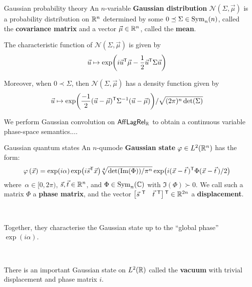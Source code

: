 \documentclass{beamer}
\begin{document}
\begin{frame}{Gaussian probability theory}
An \(n\)-variable \textbf{Gaussian distribution}  \(\mathcal{N}(\Sigma,\vec \mu)\)  is a probability distribution on \(\mathbb{R}^n\) determined by some \(0\preceq \Sigma\in\Sym[n][n]\), called the \textbf{covariance matrix} and a vector \(\vec \mu \in \mathbb{R}^n\), called the \textbf{mean}.

 The characteristic function of  \(\mathcal{N}(\Sigma,\vec \mu)\) is given by
  \[
    \vec u \mapsto \exp(i{\vec u}^{\mathsf{T}}\vec \mu-\frac{1}{2}{\vec u}^{\mathsf{T}} \Sigma \vec u)
  \]
    
   Moreover, when \(0\prec \Sigma\), then  \(\mathcal{N}(\Sigma,\vec \mu)\) has a density function given by 
  \[
    \vec u \mapsto {\exp(\frac{-1}{2}(\vec u-\vec \mu)^ \mathsf{T} \Sigma^{-1} (\vec u-\vec \mu))}/{\sqrt{(2\pi)^n \det (\Sigma)}}
  \]


We perform Gaussian convolution on \(\ALR[\R]\) to obtain a continuous variable phase-space semantics....
\end{frame}


\begin{frame}{Gaussian quantum states}
	An \(n\)-qumode \textbf{Gaussian state} 
	\(\varphi\in L^2 (\mathbb{R}^n)\) has the form:
	\[
    \varphi\left(\vec x\right)=\exp(i\alpha)
	  \exp(i\vec{s}^{\mathsf{T}} \vec x) \sqrt[4]{{\det(\Im(\Phi))}/{\pi^n }}\exp({i}(\vec x -
	  \vec t\,)^{\mathsf{T}} \Phi(\vec x-\vec t\,)/2)
	\]
  where\ \(\alpha \in [0,2\pi)\), \(\vec s,\vec t \in \mathbb{R}^n\), and \(\Phi\in \Sym[n][\C]\) with \(\Im(\Phi)\succ 0\). We call such a matrix \(\Phi\)
	a \textbf{phase matrix}, and the vector \(\begin{bmatrix} {\vec s}\ {}^{\mathsf{T}} &
	{\vec t}\ {}^{\mathsf{T}} \end{bmatrix}{}^{\mathsf{T}} \in \mathbb{R}^{2n}\) a \textbf{displacement}. 
	
	\
	
	Together, they
	characterise the Gaussian state up to the ``global phase'' \(\exp(i\alpha)\).
	
	\
	
	There is an important Gaussian state  on \(L^2(\mathbb{R})\) called the \textbf{vacuum} with trivial displacement and phase matrix \(i\).
\end{frame}
\end{document}
